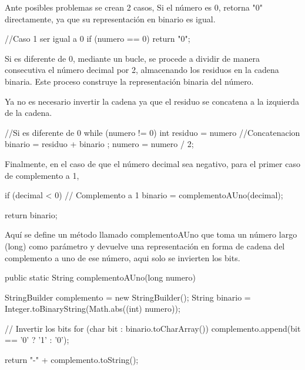 \documentclass{IEEEcsmag}
\begin{document}
\begin{javaCode}
  public static String decimalABinario(long decimal) {
        String binario = "";
        long numero = Math.abs(decimal); // Obtener el valor absoluto del número
\end{javaCode}


Ante posibles problemas se crean 2 casos,
Si el número es 0, retorna "0" directamente, ya que su representación en binario es igual.

\begin{javaCode}
    //Caso 1 ser igual a 0
    if (numero == 0) {
        return "0";
    }
\end{javaCode}

Si es diferente de 0, mediante un bucle, se procede a dividir de manera consecutiva el número decimal por 2, almacenando los residuos en la cadena binaria. Este proceso construye la representación binaria del número.

Ya no es necesario invertir la cadena ya que el residuo se concatena a la izquierda de la cadena.

\begin{javaCode}
    //Si es diferente de 0 
    while (numero != 0) {
        int residuo = numero %
        //Concatenacion 
        binario = residuo + binario ; 
        numero = numero / 2;
    }
\end{javaCode}

Finalmente, en el caso de que el número decimal sea negativo, para el primer caso de complemento a 1, 

\begin{javaCode}
      if (decimal < 0) {
            // Complemento a 1
            binario = complementoAUno(decimal);
        }

    return binario;
\end{javaCode}

Aquí se define un método llamado complementoAUno que toma un número largo (long) como parámetro y devuelve una representación en forma de cadena del complemento a uno de ese número, aqui solo se invierten los bits.

\begin{javaCode}
        public static String complementoAUno(long numero) {
        StringBuilder complemento = new StringBuilder();
        String binario = Integer.toBinaryString(Math.abs((int) numero));

        // Invertir los bits
        for (char bit : binario.toCharArray()) {
            complemento.append(bit == '0' ? '1' : '0');
        }

        return "-" + complemento.toString();
    }


\end{javaCode}
\end{document}

